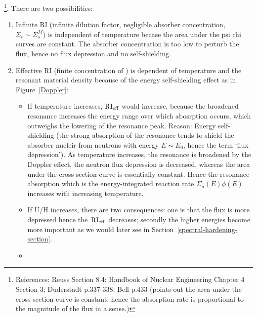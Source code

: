 \documentclass{school-22.211-notes}
\begin{document}
\footnote{References: Reuss Section 8.4; Handbook of Nuclear Engineering Chapter 4 Section 3; Duderstadt p.337-338; Bell p.433 (points out the area under the cross section curve is constant; hence the absorption rate is proportional to the magnitude of the flux in a sense.)}. 
There are two possibilities: 
\begin{enumerate}
\item Infinite RI (infinite dilution factor, negligible absorber concentration, $\Sigma_t \sim \Sigma_s^M$) is independent of temperature becase the area under the psi chi curves are constant. The absorber concentration is too low to perturb the flux, hence no flux depression and no self-shielding.  

\item Effective RI (finite concentration of ) is dependent of temperature and the resonant material density because of the energy self-shielding effect as in Figure~\ref{Doppler}: 
  \begin{itemize}
  \item If temperature increases, $\mathrm{RI}_{\mathrm{eff}}$ would increase, because the broadened resonance increases the energy range over which abosrption occurs, which outweighs the lowering of the resonance peak. Reason: Energy self-shielding (the strong absorption of the resonance tends to shield the absorber nucleir from neutrons with energy $E\sim E_0$, hence the term `flux depression').  As temperature increases, the resonance is broadened by the Doppler effect, the neutron flux depression is decreased, whereas the area under the cross section curve is essentially constant. Hence the resonance absorption which is the energy-integrated reaction rate $\Sigma_a(E) \phi(E)$ increases with increasing temperature. 

  \item If U/H increases, there are two consequences: one is that the flux is more depressed hence the $\left. \mathrm{RI}_{\mathrm{eff}} \right.$ decreases; secondly the higher energies become more important as we would later see in Section~\ref{spectral-hardening-section}. 
  \item {} 
  \end{itemize}
\end{enumerate}
\end{document}

